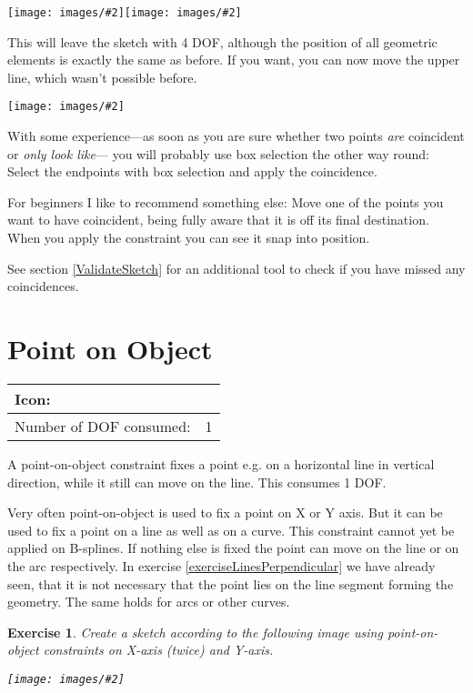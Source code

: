 \documentclass[12pt,titlepage]{article}
\newcommand{\icon}[1]{\raisebox{-1em}{\rule{0pt}{27pt}\texttt{[image: images/\#1]}}}
\newcommand{\img}[2]{\vspace{2ex}\noindent\texttt{[image: images/\#2]}}
\newcommand{\dofConsumed}{Number of DOF consumed:}
\newtheorem{Exercise}{Exercise}
\begin{document}
\img{scale=0.9}{Coincidence2}\hspace{2em}\img{scale=0.9}{Coincidence3}

This will leave the sketch with 4 DOF, although the position of all geometric elements is exactly the same as before. If you want, you can now move the upper line, which wasn't possible before.

\img{scale=0.7}{Coincidence4}

With some experience---as soon as you are sure whether two points \emph{are} coincident or \emph{only look like}--- you will probably use box selection the other way round: Select the endpoints with box selection and apply the coincidence.

For beginners I like to recommend something else: Move one of the points you want to have coincident, being fully aware that it is off its final destination. When you apply the constraint you can see it snap into position.

See section \vref{ValidateSketch} for an additional tool to check if you have missed any coincidences.


\section{Point on Object} \label{PointOnObject} \begin{tabular}{|l|l|} \hline Icon: & \icon{Constraint_PointOnObject}\\ \hline \dofConsumed & 1 \\ \hline \end{tabular}

A point-on-object constraint fixes a point e.g. on a horizontal line in vertical direction, while it still can move on the line. This consumes 1 DOF.


 Very often point-on-object is used to fix a point on X or Y axis. But it can be used to fix a point on a line as well as on a curve. This constraint cannot yet be applied on B-splines. If nothing else is fixed the point can move on the line or on the arc respectively. In exercise \vref{exerciseLinesPerpendicular} we have already seen, that it is not necessary that the point lies on the line segment forming the geometry. The same holds for arcs or other curves.

\begin{Exercise} Create a sketch according to the following image using point-on-object constraints on X-axis (twice) and Y-axis.
	
	\img{}{PointOnLine1} \end{Exercise}
\end{document}
